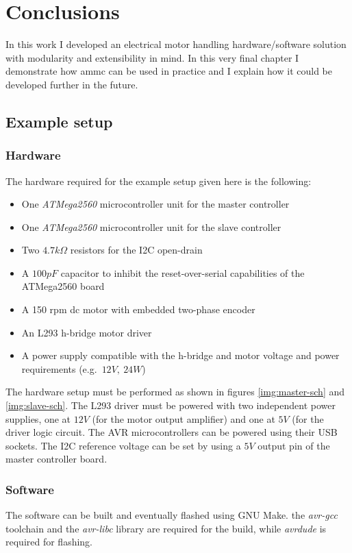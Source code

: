 \chapter{Conclusions}
\label{ch:conclusions}
In this work I developed an electrical motor handling hardware/software
solution with modularity and extensibility in mind. In this very final chapter
I demonstrate how ammc can be used in practice and I explain how it could be
developed further in the future.

\section{Example setup}

\subsection{Hardware}
The hardware required for the example setup given here is the following:
\begin{itemize}
  \item One \emph{ATMega2560} microcontroller unit for the master controller
  \item One \emph{ATMega2560} microcontroller unit for the slave controller
  \item Two $4.7 k\Omega$ resistors for the I2C open-drain
  \item A $100 pF$ capacitor to inhibit the reset-over-serial capabilities of
    the ATMega2560 board
  \item A 150 rpm dc motor with embedded two-phase encoder
  \item An L293 h-bridge motor driver
  \item A power supply compatible with the h-bridge and motor voltage and
    power requirements (e.g.\ $12 V,\ 24 W$)
\end{itemize}

The hardware setup must be performed as shown in figures \ref{img:master-sch}
and \ref{img:slave-sch}.
The L293 driver must be powered with two independent power supplies, one at
$12V$ (for the motor output amplifier) and one at $5V$ (for the driver logic
circuit. The AVR microcontrollers can be powered using their USB sockets. The
I2C reference voltage can be set by using a $5 V$ output pin of the master
controller board.

\subsection{Software}
The software can be built and eventually flashed using GNU Make. the
\emph{avr-gcc} toolchain and the \emph{avr-libc} library are required for the
build, while \emph{avrdude} is required for flashing.


